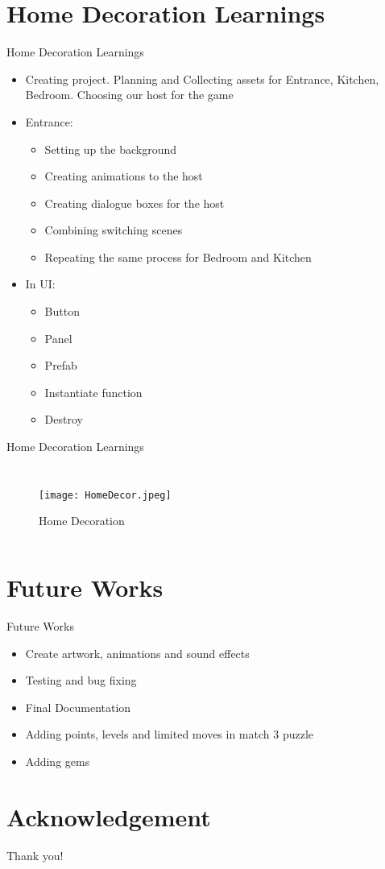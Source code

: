 \documentclass[10pt]{beamer}
\begin{document}
\section{Home Decoration Learnings}
    \begin{frame}{Home Decoration Learnings}
     \begin{itemize}
        \item Creating project. Planning and Collecting assets for Entrance, Kitchen, Bedroom. Choosing our host for the game
        \item Entrance:
        \begin{itemize}
        \item Setting up the background
	  \item Creating animations to the host
 	  \item Creating dialogue boxes for the host
        \item Combining switching scenes
        \item Repeating the same process for Bedroom and Kitchen
       \end{itemize}
        
        \item In UI:
        \begin{itemize}
        \item Button
        \item Panel
        \item Prefab
        \item Instantiate function 
        \item Destroy
	  
       \end{itemize}
        
    \end{itemize}
    \end{frame}
\begin{frame}{Home Decoration Learnings}
         \begin{columns}
        \begin{figure}
        \texttt{[image: HomeDecor.jpeg]}
        \caption{Home Decoration}
        \end{figure}
        \end{columns}
    \end{frame}

\section{Future Works}
    \begin{frame}{Future Works}
     \begin{itemize}
         \item Create artwork, animations and sound effects
        \item Testing and bug fixing
        \item Final Documentation
        \item Adding points, levels and limited moves in match 3 puzzle
        \item Adding gems
    \end{itemize}
    \end{frame}
\section*{Acknowledgement}  
\begin{frame}
\textcolor{myNewColorA}{\Huge{\centerline{Thank you!}}}
\end{frame}
\end{document}
